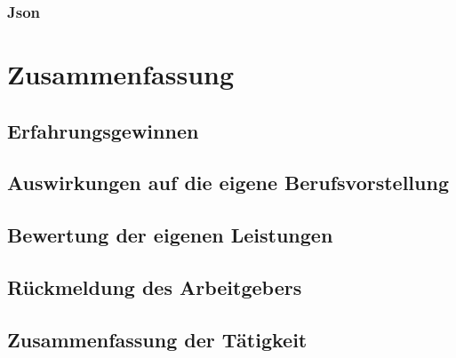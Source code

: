 \documentclass[10pt,a4paper]{report}
\begin{document}
\subsection{Json}

\chapter{Zusammenfassung}

\section{Erfahrungsgewinnen}

\section{Auswirkungen auf die eigene Berufsvorstellung}

\section{Bewertung der eigenen Leistungen}

\section{Rückmeldung des Arbeitgebers}

\section{Zusammenfassung der Tätigkeit}

\printbibliography
	                      	
\end{document}
